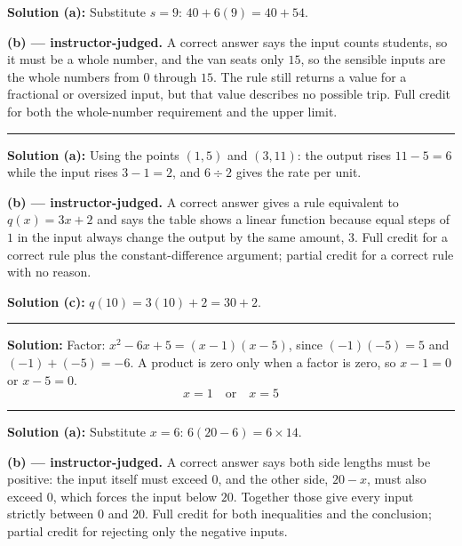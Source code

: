 \documentclass[12pt]{article}
\begin{document}
\textbf{Solution (a):} Substitute $s = 9$: $40 + 6(9) = 40 + 54$. 

\textbf{(b) --- instructor-judged.} A correct answer says the input counts students, so it must be a whole number, and the van seats only $15$, so the sensible inputs are the whole numbers from $0$ through $15$. The rule still returns a value for a fractional or oversized input, but that value describes no possible trip. Full credit for both the whole-number requirement and the upper limit.

\vspace{0.2cm}\noindent\rule{\linewidth}{0.2pt}


\textbf{Solution (a):} Using the points $(1,5)$ and $(3,11)$: the output rises $11 - 5 = 6$ while the input rises $3 - 1 = 2$, and $6 \div 2$ gives the rate per unit. 

\textbf{(b) --- instructor-judged.} A correct answer gives a rule equivalent to $q(x) = 3x + 2$ and says the table shows a linear function because equal steps of $1$ in the input always change the output by the same amount, $3$. Full credit for a correct rule plus the constant-difference argument; partial credit for a correct rule with no reason.

\textbf{Solution (c):} $q(10) = 3(10) + 2 = 30 + 2$. 

\vspace{0.2cm}\noindent\rule{\linewidth}{0.2pt}


\textbf{Solution:} Factor: $x^2 - 6x + 5 = (x - 1)(x - 5)$, since $(-1)(-5) = 5$ and $(-1) + (-5) = -6$. A product is zero only when a factor is zero, so $x - 1 = 0$ or $x - 5 = 0$.
\[ \boxed{x = 1 \quad \text{or} \quad x = 5} \]

\vspace{0.2cm}\noindent\rule{\linewidth}{0.2pt}


\textbf{Solution (a):} Substitute $x = 6$: $6(20 - 6) = 6 \times 14$. 

\textbf{(b) --- instructor-judged.} A correct answer says both side lengths must be positive: the input itself must exceed $0$, and the other side, $20 - x$, must also exceed $0$, which forces the input below $20$. Together those give every input strictly between $0$ and $20$. Full credit for both inequalities and the conclusion; partial credit for rejecting only the negative inputs.
\end{document}

